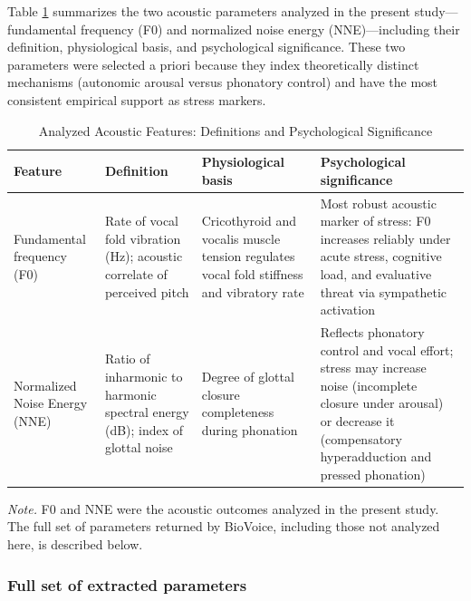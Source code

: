 \documentclass[
  english,
  man,floatsintext]{apa6}
\begin{document}
Table \ref{tab:acoustic-features} summarizes the two acoustic parameters analyzed in the present study---fundamental frequency (F0) and normalized noise energy (NNE)---including their definition, physiological basis, and psychological significance. These two parameters were selected a priori because they index theoretically distinct mechanisms (autonomic arousal versus phonatory control) and have the most consistent empirical support as stress markers.

\begin{table}[H]
\centering
\caption{Analyzed Acoustic Features: Definitions and Psychological Significance}
\label{tab:acoustic-features}
\begin{threeparttable}
\scriptsize
\begin{tabular}{p{2.4cm} p{3.2cm} p{2.6cm} p{3.0cm}}
\hline
Feature & Definition & Physiological basis & Psychological significance \\
\hline
Fundamental frequency (F0) & Rate of vocal fold vibration (Hz); acoustic correlate of perceived pitch & 
Cricothyroid and vocalis muscle tension regulates vocal fold stiffness and vibratory rate & 
Most robust acoustic marker of stress: F0 increases reliably under acute stress, cognitive load, and evaluative threat via sympathetic activation \\[4pt]

Normalized Noise Energy (NNE) & Ratio of inharmonic to harmonic spectral energy (dB); index of glottal noise & 
Degree of glottal closure completeness during phonation & 
Reflects phonatory control and vocal effort; stress may increase noise (incomplete closure under arousal) or decrease it (compensatory hyperadduction and pressed phonation) \\[4pt]
\hline
\end{tabular}

\begin{tablenotes}
\footnotesize
\item \textit{Note.} F0 and NNE were the acoustic outcomes analyzed in the present study. The full set of parameters returned by BioVoice, including those not analyzed here, is described below.
\end{tablenotes}
\end{threeparttable}
\end{table}

\subsubsection{Full set of extracted parameters}\label{full-set-of-extracted-parameters}
\end{document}

